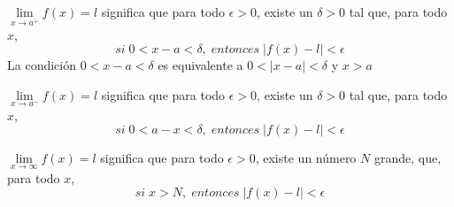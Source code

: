 \begin{tcolorbox}[colframe=white]
    \begin{def.}
	$\lim\limits_{x \to a^+} f(x)=l$ significa que para todo $\epsilon>0$, existe un $\delta>0$ tal que, para todo $x$, $$si \; 0<x-a<\delta, \; entonces \; |f(x)-l|<\epsilon$$	
	La condición $0<x-a<\delta$ es equivalente a $0<|x-a|<\delta$ y $x>a$
    \end{def.}
\end{tcolorbox}

\begin{tcolorbox}[colframe=white]
    \begin{def.}
	$\lim\limits_{x \to a^-} f(x)=l$ significa que para todo $\epsilon>0$, existe un $\delta>0$ tal que, para todo $x$, $$si \; 0<a-x<\delta, \; entonces \; |f(x)-l|<\epsilon$$	
    \end{def.}
\end{tcolorbox}

\begin{tcolorbox}[colframe=white]
    \begin{def.}
	$\lim\limits_{x \to \infty} f(x)=l$ significa que para todo $\epsilon>0$, existe un número $N$ grande, que, para todo $x$, $$si \; x>N, \; entonces \; |f(x)-l|<\epsilon$$	
    \end{def.}
\end{tcolorbox}

